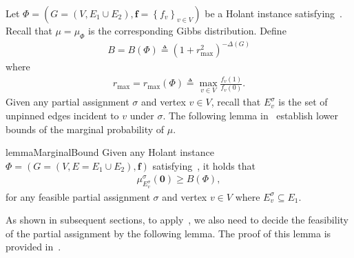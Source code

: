 \documentclass[11pt]{article}
\newcommand{\set}[1]{\left\{#1\right\}}
\newcommand{\defeq}{\triangleq} \renewcommand{\d}{\,\-d}
\newcommand{\zero}{\boldsymbol{0}}
\newcommand{\vecf}{\boldsymbol{f}}
\newcommand{\zdtodo}[1]{\todo[color = blue!40, size = \tiny]{\textbf{zhidan:} #1}}
\newcommand{\zd}[1]{{\color{green} #1}}
\begin{document}

Let $\Phi = \left(G = (V, E_1\cup E_2), \vecf = \set{f_v}_{v \in V}\right)$ be a Holant instance satisfying~. Recall that $\mu = \mu_{\Phi}$ is the corresponding Gibbs distribution. Define 
\begin{align}\label{eq-def-bmin}
    B = B(\Phi) \defeq (1 + r_{\max}^2)^{-\Delta(G)}
\end{align}
where 
\begin{align}\label{eq-def-rmax}
r_{\max} = r_{\max}(\Phi) \defeq \max_{v \in V} \frac{f_v(1)}{f_v(0)}.
\end{align}
Given any partial assignment $\sigma$ and vertex $v\in V$, recall that $E_v^\sigma$ is the set of unpinned edges incident to $v$ under $\sigma$. The following lemma in~\cite{CG24bMatching} establish lower bounds of the marginal probability of $\mu$.
\begin{restatable}{lemma}{MarginalBound} \label{lem:marginal-bound}
    Given any Holant instance $\Phi = \left(G=(V,E=E_1\cup E_2) , \vecf \right)$ satisfying~, it holds that
    \begin{align} \label{eq:marginal-bound}
        \mu_{E_v^\sigma}^{\sigma}(\zero) \ge B(\Phi),
    \end{align}
    for any feasible partial assignment $\sigma$ and vertex $v\in V$ where $E^{\sigma}_v\subseteq E_1$.
\end{restatable}
    As shown in subsequent sections, to apply~, we also need to decide the feasibility of the partial assignment by the following lemma. The proof of this lemma is provided in~.
\end{document}
